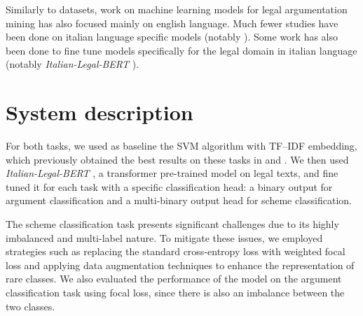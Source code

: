 \documentclass[11pt]{article}
\begin{document}
Similarly to datasets, work on machine learning models for legal argumentation mining has also focused mainly on english language. Much fewer studies have been done on italian language specific models (notably \cite{galli2022}). Some work has also been done to fine tune models specifically for the legal domain in italian language (notably \textit{Italian-Legal-BERT} \cite{LICARI2024105908}).

\section{System description}
\label{sec:system}

For both tasks, we used as baseline the SVM algorithm with TF–IDF embedding, which previously obtained the best results on these tasks in \cite{grundler-etal-2022-detecting} and \cite{galli2022}. We then used \textit{Italian-Legal-BERT} \cite{LICARI2024105908}, a transformer pre-trained model on legal texts, and fine tuned it for each task with a specific classification head: a binary output for argument classification and a multi-binary output head for scheme classification.

The scheme classification task presents significant challenges due to its highly imbalanced and multi-label nature. To mitigate these issues, we employed strategies such as replacing the standard cross-entropy loss with weighted focal loss and applying data augmentation techniques to enhance the representation of rare classes. We also evaluated the performance of the model on the argument classification task using focal loss, since there is also an imbalance between the two classes.
\end{document}

